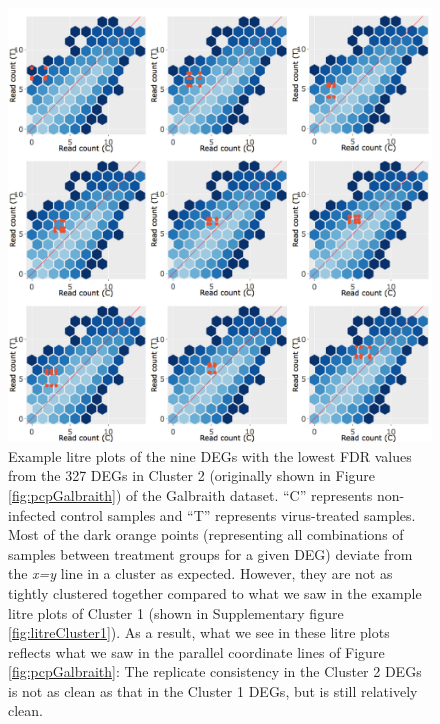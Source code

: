 \documentclass[11pt,a4paper,oldfontcommands,openany]{memoir}
\numberwithin{equation}{section} %
\begin{document}
\begin{figure}[H]
\begin{framed}
  \includegraphics[width=\textwidth]{Images/litreCluster2}
\end{framed}
  \caption{Example litre plots of the nine DEGs with the lowest FDR values from the 327 DEGs in Cluster 2 (originally shown in Figure \ref{fig:pcpGalbraith}) of the Galbraith dataset. ``C'' represents non-infected control samples and ``T'' represents virus-treated samples. Most of the dark orange points (representing all combinations of samples between treatment groups for a given DEG) deviate from the \textit{x=y} line in a cluster as expected. However, they are not as tightly clustered together compared to what we saw in the example litre plots of Cluster 1 (shown in Supplementary figure \ref{fig:litreCluster1}). As a result, what we see in these litre plots reflects what we saw in the parallel coordinate lines of Figure \ref{fig:pcpGalbraith}: The replicate consistency in the Cluster 2 DEGs is not as clean as that in the Cluster 1 DEGs, but is still relatively clean.}
  \label{fig:litreCluster2}
\end{figure}
\end{document}
